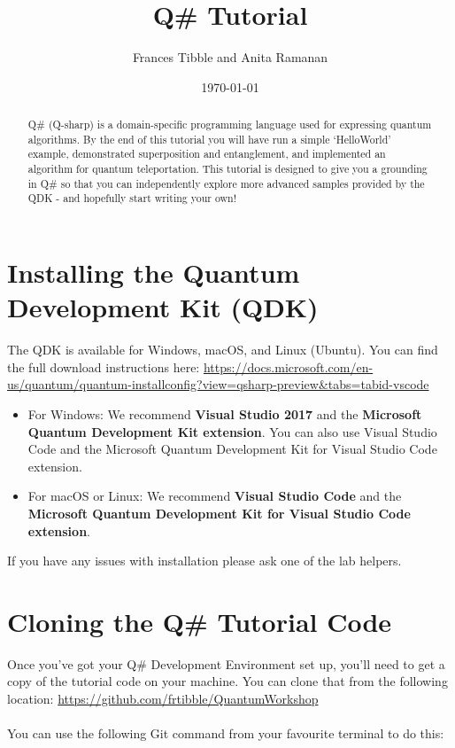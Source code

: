 \documentclass[a4paper]{article}
\title{Q\# Tutorial}
\author{Frances Tibble and Anita Ramanan}
\date{\today}
\begin{document}
\maketitle

\begin{abstract}
Q\# (Q-sharp) is a domain-specific programming language used for expressing quantum algorithms. By the end of this tutorial you will have run a simple `HelloWorld' example, demonstrated superposition and entanglement, and implemented an algorithm for quantum teleportation. This tutorial is designed to give you a grounding in Q\# so that you can independently explore more advanced samples provided by the QDK - and hopefully start writing your own!
\end{abstract}

\section{Installing the Quantum Development Kit (QDK)}
\label{sec:install}

The QDK is available for Windows, macOS, and Linux (Ubuntu). You can find the full download instructions here:
\url{https://docs.microsoft.com/en-us/quantum/quantum-installconfig?view=qsharp-preview&tabs=tabid-vscode}

\begin{itemize}
\item For Windows: We recommend \textbf{Visual Studio 2017} and the \textbf{Microsoft Quantum Development Kit extension}. You can also use Visual Studio Code and the Microsoft Quantum Development Kit for Visual Studio Code extension. 
\item For macOS or Linux: We recommend \textbf{Visual Studio Code} and the \textbf{Microsoft Quantum Development Kit for Visual Studio Code extension}.
\end{itemize}

If you have any issues with installation please ask one of the lab helpers.

\section{Cloning the Q\# Tutorial Code}
\label{sec:tutorialcode}
Once you've got your Q\# Development Environment set up, you'll need to get a copy of the tutorial code on your machine. You can clone that from the following location: 
\url{https://github.com/frtibble/QuantumWorkshop}
\\
\\
You can use the following Git command from your favourite terminal to do this:\\
\end{document}
